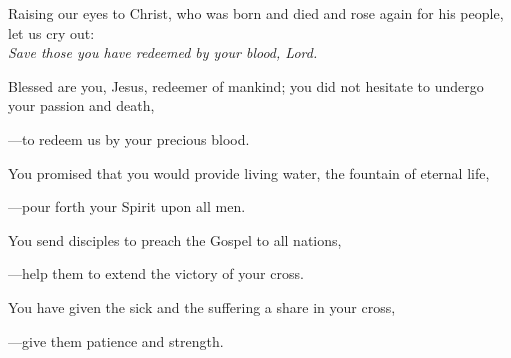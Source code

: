 \intercessions\indent

\begin{hangpar}

Raising our eyes to Christ, who was born and died and rose again for his people, let us cry out:\\
\emph{Save those you have redeemed by your blood, Lord.}

\medskip Blessed are you, Jesus, redeemer of mankind; you did not hesitate to undergo your passion and death,

{\color{red}---\thinspace}to redeem us by your precious blood.

\medskip You promised that you would provide living water, the fountain of eternal life,

{\color{red}---\thinspace}pour forth your Spirit upon all men.

\medskip You send disciples to preach the Gospel to all nations,

{\color{red}---\thinspace}help them to extend the victory of your cross.

\medskip You have given the sick and the suffering a share in your cross,

{\color{red}---\thinspace}give them patience and strength.

\end{hangpar}

